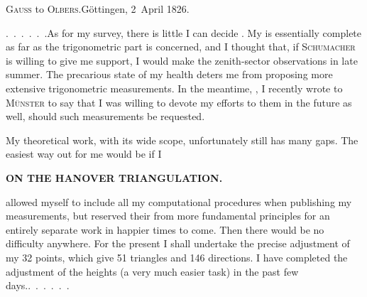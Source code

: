 \begin{center}
\textsc{Gauss} to \textsc{Olbers}.\quad Göttingen, 2~April 1826.
\end{center}

\par\noindent\hspace*{\parindent}\mbox{.\ .\ .\ .\ .\ .}\quad As for my survey, there is little I can decide .
My  is essentially complete as far as the trigonometric part is concerned, and I thought that, if \textsc{Schumacher} is willing to give me  support, I would make the zenith-sector observations in late summer.
The precarious state of my health deters me from proposing more extensive trigonometric measurements. In the meantime, , I recently wrote to \textsc{Münster} to say that I was willing to devote my efforts to them in the future as well, should such measurements be requested.

\par\noindent\hspace*{\parindent}My theoretical work, with its  wide scope, unfortunately still has many gaps. The easiest way out for me would be if I
\par\clearpage
\noindent\null\hfill{\small\textbf{ON THE HANOVER TRIANGULATION.}}\hfill{}\par\medskip
\noindent allowed myself to include all my computational procedures when publishing my measurements, but reserved their  from more fundamental principles for an entirely separate work in happier times to come.
Then there would be no difficulty anywhere.
For the present I shall undertake the precise adjustment of my 32 points, which give 51 triangles and 146 directions.
I have completed the adjustment of the heights (a very much easier task) in the past few days.\quad\mbox{.\ .\ .\ .\ .\ .}
